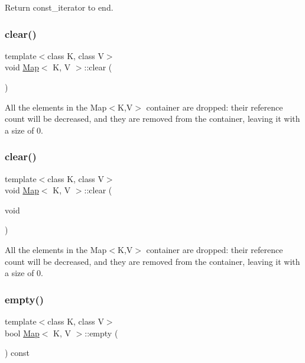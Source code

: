 Return const\+\_\+iterator to end. \mbox{\label{classMap_a80965141d2c8dfbeb55782316130a7af}} 
\subsubsection{\texorpdfstring{clear()}{clear()}\hspace{0.1cm}{\footnotesize\ttfamily [1/2]}}
{\footnotesize\ttfamily template$<$class K, class V$>$ \\
void \hyperlink{classMap}{Map}$<$ K, V $>$\+::clear (\begin{DoxyParamCaption}{ }\end{DoxyParamCaption})\hspace{0.3cm}{\ttfamily [inline]}}

All the elements in the Map$<$\+K,\+V$>$ container are dropped\+: their reference count will be decreased, and they are removed from the container, leaving it with a size of 0. \mbox{\label{classMap_a80965141d2c8dfbeb55782316130a7af}} 
\subsubsection{\texorpdfstring{clear()}{clear()}\hspace{0.1cm}{\footnotesize\ttfamily [2/2]}}
{\footnotesize\ttfamily template$<$class K, class V$>$ \\
void \hyperlink{classMap}{Map}$<$ K, V $>$\+::clear (\begin{DoxyParamCaption}\item[{void}]{ }\end{DoxyParamCaption})\hspace{0.3cm}{\ttfamily [inline]}}

All the elements in the Map$<$\+K,\+V$>$ container are dropped\+: their reference count will be decreased, and they are removed from the container, leaving it with a size of 0. \mbox{\label{classMap_aabea9760ee5af9503c1230ad29cc4db7}} 
\subsubsection{\texorpdfstring{empty()}{empty()}\hspace{0.1cm}{\footnotesize\ttfamily [1/2]}}
{\footnotesize\ttfamily template$<$class K, class V$>$ \\
bool \hyperlink{classMap}{Map}$<$ K, V $>$\+::empty (\begin{DoxyParamCaption}{ }\end{DoxyParamCaption}) const\hspace{0.3cm}{\ttfamily [inline]}}

